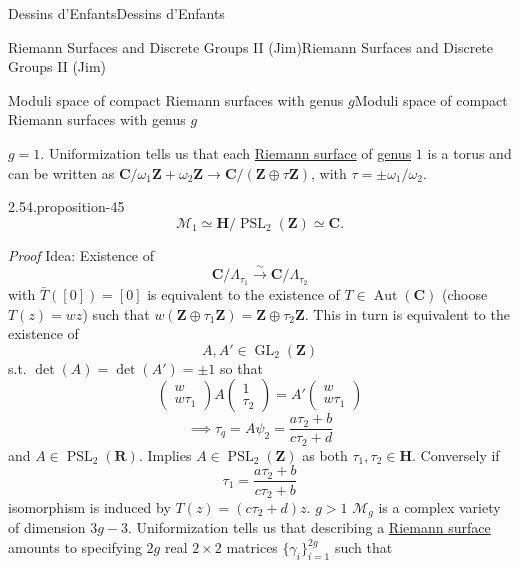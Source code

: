 \documentclass[10pt,]{book}
\makeatletter
\renewcommand*{\proofname}{Proof}
\renewenvironment{proof}[1][\proofname]{\par
  \pushQED{\qed}%
  \normalfont \topsep6\p@\@plus6\p@\relax
  \trivlist
  \item\relax
    {\itshape
    #1\@addpunct{.}}\hspace\labelsep\ignorespaces
}{%
  \popQED\endtrivlist\@endpefalse
}
\numberwithin{equation}{section}
\newcommand{\lb}{[}
\newcommand{\rb}{]}
\newcommand{\ZZ}{\mathbf{Z}}
\newcommand{\RR}{\mathbf{R}}
\newcommand{\CC}{\mathbf{C}}
\newcommand{\HH}{\mathbf{H}}
\DeclareMathOperator{\Aut}{Aut}
\DeclareMathOperator{\GL}{GL}
\DeclareMathOperator{\PSL}{PSL}
\newcommand{\gt}{>}
\makeatother
\begin{document}
\begin{chapterptx}{Dessins d'Enfants}{}{Dessins d'Enfants}{}{}
\begin{sectionptx}{Riemann Surfaces and Discrete Groups II (Jim)}{}{Riemann Surfaces and Discrete Groups II (Jim)}{}{}
\begin{subsectionptx}{Moduli space of compact Riemann surfaces with genus \(g\)}{}{Moduli space of compact Riemann surfaces with genus \(g\)}{}{}
\par
\hypertarget{p-574}{}%
\(g = 1\). Uniformization tells us that each \hyperref[def-top-riem-surface]{Riemann surface} of \hyperref[def-class-set]{genus} \(1\) is a torus and can be written as \(\CC/ \omega_1\ZZ+ \omega_2\ZZ \to \CC/(\ZZ \oplus \tau \ZZ)\), with \(\tau = \pm \omega_1/\omega_2\).%
\begin{proposition}{2.54.}{}{proposition-45}%
\hypertarget{p-575}{}%
%
\begin{equation*}
\mathcal M_1 \simeq \HH/ \PSL_2(\ZZ) \simeq \CC\text{.}
\end{equation*}
%
\end{proposition}
\begin{proof}\hypertarget{proof-90}{}
\hypertarget{p-576}{}%
Idea: Existence of%
\begin{equation*}
\CC/ \Lambda_{\tau_1} \xrightarrow{\sim} \CC/\Lambda_{\tau_2}
\end{equation*}
with \(\bar T (\lb 0 \rb) = \lb 0 \rb\) is equivalent to the existence of \(T \in \Aut(\CC)\) (choose \(T(z) = wz\)) such that \(w(\ZZ\oplus \tau_1 \ZZ) = \ZZ\oplus \tau_2\ZZ\). This in turn is equivalent to the existence of%
\begin{equation*}
A,A' \in \GL_2(\ZZ)
\end{equation*}
s.t. \(\det (A) = \det(A') = \pm 1\) so that%
\begin{equation*}
\begin{pmatrix} w\\ w\tau_1 \end{pmatrix} A \begin{pmatrix}1\\ \tau_2\end{pmatrix} = A' \begin{pmatrix} w \\ w\tau_1 \end{pmatrix}
\end{equation*}
%
\begin{equation*}
\implies \tau_q = A \psi_2 = \frac{a\tau_2 + b}{c\tau_2 + d}
\end{equation*}
and \(A \in \PSL_2(\RR)\). Implies \(A\in \PSL_2(\ZZ)\) as both \(\tau_1,\tau_2 \in \HH\). Conversely if%
\begin{equation*}
\tau_1 = \frac{a\tau_2 + b}{c\tau_2 + b}
\end{equation*}
isomorphism is induced by \(T(z) = (c\tau_2 + d) z\).%
\end{proof}
\hypertarget{p-577}{}%
\(g \gt 1\) \(\mathcal M_g\) is a complex variety of dimension \(3g-3\). Uniformization tells us that describing a \hyperref[def-top-riem-surface]{Riemann surface} amounts to specifying \(2g\) real \(2\times 2\) matrices \(\{\gamma_i\}_{i=1}^{2g}\) such that\leavevmode%

\end{subsectionptx}
\end{sectionptx}
\end{chapterptx}
\end{document}
